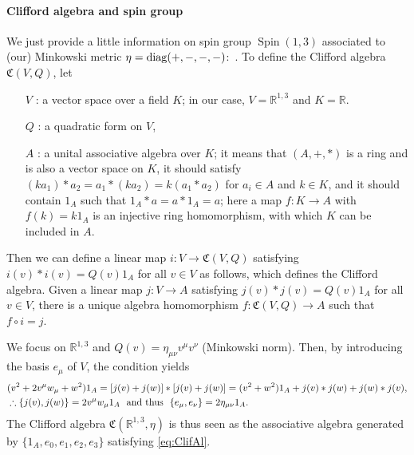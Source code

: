\documentclass[CheatSheet]{subfiles}
\begin{document}
\paragraph{Clifford algebra and spin group}
We just provide a little information on spin group $\mathop{\mathrm Spin}(1,3)$ associated to (our) Minkowski metric $\eta=\operatorname{\mathrm{diag}}(+,-,-,-)$:~\cite{RauschdeTraubenberg:2005aa,Yamaguchi:spinor,Wikipedia:Clifford_Algebra}. To define the Clifford algebra $\mathfrak C(V,Q)$, let
\begin{itemize}
 \item[$V$]: a vector space over a field $K$; in our case, $V=\mathbb R^{1,3}$ and $K=\mathbb R$.
 \item[$Q$]: a quadratic form on $V$,
 \item[$A$]: %
  a unital associative algebra over $K$; it means that $(A, +, \ast)$ is a ring and is also a vector space on $K$, it should satisfy
  $(k a_1)\ast a_2=a_1\ast(ka_2)=k(a_1\ast a_2)$ for $a_i\in A$ and $k\in K$, and it should contain $1_A$ such that $1_A\ast a=a\ast 1_A=a$;
  here a map $f:K\to A$ with $f(k)=k1_A$ is an injective ring homomorphism, with which $K$ can be included in $A$.
\end{itemize}
Then we can define a linear map $i:V\to \mathfrak C(V,Q)$ satisfying $i(v)\ast i(v)=Q(v)1_A$ for all $v\in V$ as follows, which defines the Clifford algebra.
Given a linear map $j:V\to A$ satisfying $j(v)\ast j(v)=Q(v)1_A$ for all $v\in V$, there is a unique algebra homomorphism $f:\mathfrak C(V,Q)\to A$ such that $f\circ i=j$.

We focus on $\mathbb R^{1,3}$ and $Q(v)=\eta_{\mu\nu}v^\mu v^\nu$ (Minkowski norm). Then, by introducing the basis $e_\mu$ of $V$, the condition yields
\begin{align}
& (v^2+2v^\mu w_\mu + w^2)1_A = [j(v)+j(w)]\ast[j(v)+j(w)] = (v^2+w^2)1_A+j(v)\ast j(w)+j(w)\ast j(v),\notag\\
&\therefore \{j(v),j(w)\}=2v^\mu w_\mu 1_A
\text{~~and thus~~} \{e_\mu,e_\nu\}=2\eta_{\mu\nu} 1_A.\label{eq:ClifAl}
\end{align}
The Clifford algebra $\mathfrak C(\mathbb R^{1,3},\eta)$ is thus seen as the associative algebra generated by $\{1_A, e_0, e_1, e_2, e_3\}$ satisfying \cref{eq:ClifAl}.
\end{document}
